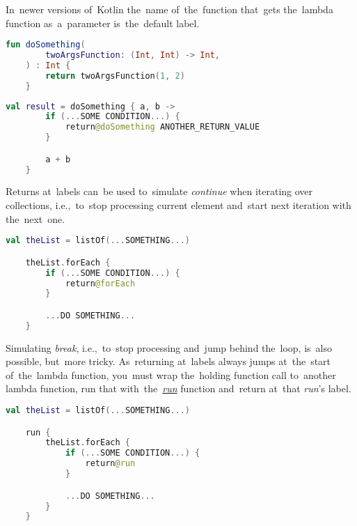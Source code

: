 \noindent In~newer versions of~Kotlin the~name of~the~function that~gets the~lambda function as~a~parameter is~the~default label.

\begin{lstlisting}[language=Kotlin, title={Function taking other function as the~only parameter}]
    fun doSomething(
        twoArgsFunction: (Int, Int) -> Int,
    ) : Int {
        return twoArgsFunction(1, 2)
    }
\end{lstlisting}
\begin{lstlisting}[language=Kotlin, title={Usage}]
    val result = doSomething { a, b ->
        if (...SOME CONDITION...) {
            return@doSomething ANOTHER_RETURN_VALUE
        }

        a + b
    }
\end{lstlisting}
\newline

\noindent Returns at~labels can~be used to~simulate \textit{continue} when iterating over collections, i.e.,~to~stop processing current element and~start next iteration with the~next~one.
\begin{lstlisting}[language=Kotlin]
    val theList = listOf(...SOMETHING...)

    theList.forEach {
        if (...SOME CONDITION...) {
            return@forEach
        }

        ...DO SOMETHING...
    }
\end{lstlisting}

\note Simulating \textit{break}, i.e.,~to~stop processing and~jump behind the~loop, is~also possible, but~more tricky.
As~returning at~labels always jumps at~the~start of~the~lambda function, you~must wrap the~holding function call to~another lambda function, run that with~the~\hyperref[kotlinrun]{\textit{run}} function and~return at~that \textit{run}'s label.

\begin{lstlisting}[language=Kotlin]
    val theList = listOf(...SOMETHING...)

    run {
        theList.forEach {
            if (...SOME CONDITION...) {
                return@run
            }

            ...DO SOMETHING...
        }
    }
\end{lstlisting}
